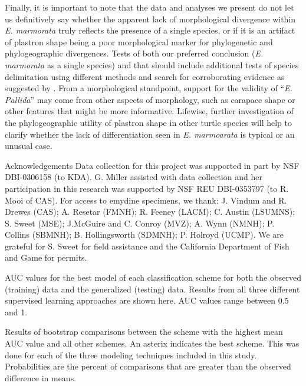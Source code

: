 \documentclass[12pt,letterpaper]{article}
\renewcommand{\section}[1]{%
\bigskip
\begin{center}
\begin{Large}
\normalfont\scshape #1
\medskip
\end{Large}
\end{center}}
\begin{document}
Finally, it is important to note that the data and analyses we present do not let us definitively say whether the apparent lack of morphological divergence within \textit{E. marmorata} truly reflects the presence of a single species, or if it is an artifact of plastron shape being a poor morphological marker for phylogenetic and phylogeographic divergences. Tests of both our preferred conclusion (\textit{E. marmorata} as a single species) and that \citet{Spinks2014} should include additional tests of species delimitation using different methods and search for corroborating evidence as suggested by \citet{Carstens2013}. From a morphological standpoint, support for the validity of ``\textit{E. Pallida}'' may come from other aspects of morphology, such as carapace shape or other features that might be more informative. Lifewise, further investigation of the phylogeographic utility of plastron shape in other turtle species will help to clarify whether the lack of differentiation seen in \textit{E. marmoarata} is typical or an unusual case.


\section*{Acknowledgements}
Data collection for this project was supported in part by NSF DBI-0306158 (to KDA). G. Miller assisted with data collection and her participation in this research was supported by NSF REU DBI-0353797 (to R. Mooi of CAS). For access to emydine specimens, we thank: J. Vindum and R. Drewes (CAS); A. Resetar (FMNH); R. Feeney (LACM); C. Austin (LSUMNS); S. Sweet (MSE); J.McGuire and C. Conroy (MVZ); A. Wynn (NMNH); P. Collins (SBMNH); B. Hollingsworth (SDMNH); P. Holroyd (UCMP). We are grateful for S. Sweet for field assistance and the California Department of Fish and Game for permits.

\clearpage



\clearpage

\begin{table}[ht]
  \centering
  
  \caption{AUC values for the best model of each classification scheme for both the observed (training) data and the generalized (testing) data. Results from all three different supervised learning approaches are shown here. AUC values range between 0.5 and 1. }
  \label{tab:comp}
\end{table}

\begin{table}
  
  
  
  \caption{Results of bootstrap comparisons between the scheme with the highest mean AUC value and all other schemes. An asterix indicates the best scheme. This was done for each of the three modeling techniques included in this study. Probabilities are the percent of comparisons that are greater than the observed difference in means.}
  \label{tab:gen_tests}
\end{table}
\end{document}
